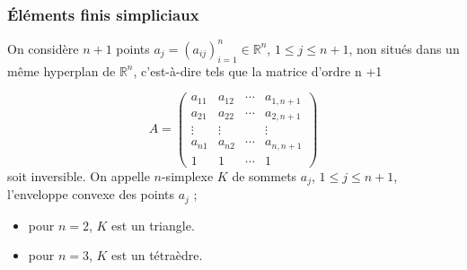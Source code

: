 \documentclass{beamer}
\begin{document}
%
%
%

\begin{frame}
\frametitle{Éléments finis simpliciaux}
On considère $n +1$ points $a_j=(a_{ij})_{i=1}^n\in \mathbb{R}^n$, $1\leq j \leq n+1$, non situés dans un même hyperplan de $\mathbb{R}^n$, c'est-à-dire tels que la matrice d'ordre n +1

\begin{equation}
A=\left(\begin{array}{llll}
a_{11} & a_{12} & \cdots & a_{1,n+1} \\ 
a_{21} & a_{22} & \cdots & a_{2,n+1} \\ 
\vdots& \vdots &  & \vdots \\ 
a_{n1} & a_{n2} & \cdots & a_{n,n+1} \\ 
1 & 1 & \cdots & 1
\end{array}\right)
\end{equation}
soit inversible. On appelle $n$-simplexe $K$ de sommets $a_j$, $1\leq j\leq n+1$,                                                                                                         l'enveloppe convexe des points $a_j$ ; 
\begin{itemize}
\item pour $n=2$, $K$ est un triangle.
\item pour $n = 3$, $K$ est un tétraèdre.
\end{itemize}
\end{frame}
\end{document}
